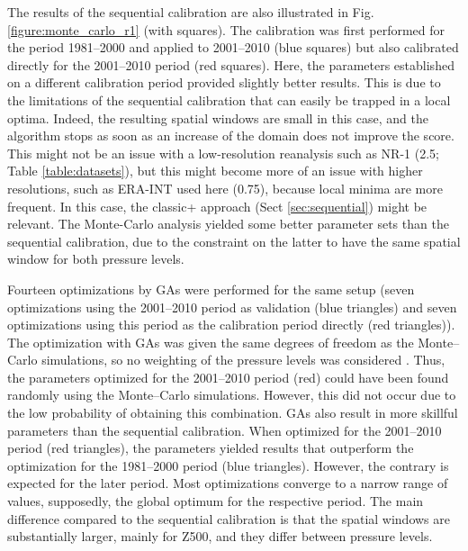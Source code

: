 \documentclass[review]{elsarticle}
\begin{document}
The results of the sequential calibration are also illustrated in Fig. \ref{figure:monte_carlo_r1} (with squares). The calibration was first performed for the period 1981--2000 and applied to 2001--2010 (blue squares) but also calibrated directly for the 2001--2010 period (red squares). Here, the parameters established on a different calibration period provided slightly better results. This is due to the limitations of the sequential calibration that can easily be trapped in a local optima. Indeed, the resulting spatial windows are small in this case, and the algorithm stops as soon as an increase of the domain does not improve the score. This might not be an issue with a low-resolution reanalysis such as NR-1 (2.5\degree; Table \ref{table:datasets}), but this might become more of an issue with higher resolutions, such as ERA-INT used here (0.75\degree), because local minima are more frequent. In this case, the classic+ approach (Sect \ref{sec:sequential}) might be relevant. The Monte-Carlo analysis yielded some better parameter sets than the sequential calibration, due to the constraint on the latter to have the same spatial window for both pressure levels. 

Fourteen optimizations by GAs were performed for the same setup (seven optimizations using the 2001--2010 period as validation (blue triangles) and seven optimizations using this period as the calibration period directly (red triangles)). The optimization with GAs was given the same degrees of freedom as the Monte--Carlo simulations, so no weighting of the pressure levels was considered \citep[as in][]{Horton2018a}. Thus, the parameters optimized for the 2001--2010 period (red) could have been found randomly using the Monte--Carlo simulations. However, this did not occur due to the low probability of obtaining this combination. GAs also result in more skillful parameters than the sequential calibration. When optimized for the 2001--2010 period (red triangles), the parameters yielded results that outperform the optimization for the 1981--2000 period (blue triangles). However, the contrary is expected for the later period. Most optimizations converge to a narrow range of values, supposedly, the global optimum for the respective period. The main difference compared to the sequential calibration is that the spatial windows are substantially larger, mainly for Z500, and they differ between pressure levels.  
\end{document}
